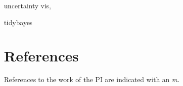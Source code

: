 \documentclass[11pt]{article}
\begin{document}
uncertainty vis, \cite{kale2018hypothetical} \cite{kay2016bus, Fernandes2018}

tidybayes








\newpage
\setcounter{page}{1}
\section*{References}
References to the work of the PI are indicated with an \emph{m}.




\end{document}
